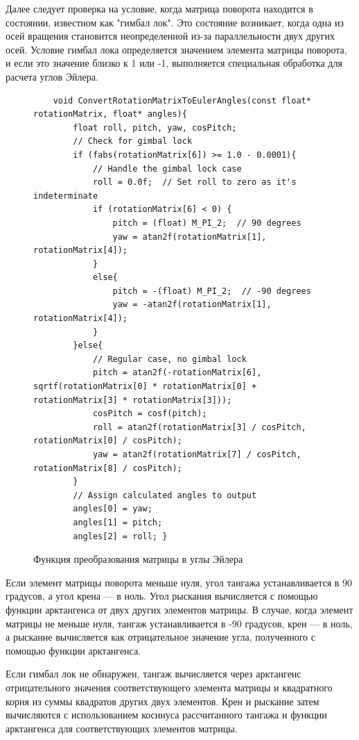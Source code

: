 Далее следует проверка на условие, когда матрица поворота находится в состоянии, известном как "гимбал лок". Это состояние возникает, когда одна из осей вращения становится неопределенной из-за параллельности двух других осей. Условие гимбал лока определяется значением элемента матрицы поворота, и если это значение близко к 1 или -1, выполняется специальная обработка для расчета углов Эйлера.



\begin{figure}[H]
	\centering
	\begin{verbatim}
    void ConvertRotationMatrixToEulerAngles(const float* rotationMatrix, float* angles){
        float roll, pitch, yaw, cosPitch;
        // Check for gimbal lock
        if (fabs(rotationMatrix[6]) >= 1.0 - 0.0001){
            // Handle the gimbal lock case
            roll = 0.0f;  // Set roll to zero as it's indeterminate
            if (rotationMatrix[6] < 0) {
                pitch = (float) M_PI_2;  // 90 degrees
                yaw = atan2f(rotationMatrix[1], rotationMatrix[4]);
            }
            else{
                pitch = -(float) M_PI_2;  // -90 degrees
                yaw = -atan2f(rotationMatrix[1], rotationMatrix[4]);
            }
        }else{
            // Regular case, no gimbal lock
            pitch = atan2f(-rotationMatrix[6], sqrtf(rotationMatrix[0] * rotationMatrix[0] + rotationMatrix[3] * rotationMatrix[3]));
            cosPitch = cosf(pitch);
            roll = atan2f(rotationMatrix[3] / cosPitch, rotationMatrix[0] / cosPitch);
            yaw = atan2f(rotationMatrix[7] / cosPitch, rotationMatrix[8] / cosPitch);
        }
        // Assign calculated angles to output
        angles[0] = yaw;
        angles[1] = pitch;
        angles[2] = roll; }
	\end{verbatim}
	\caption{Функция преобразования матрицы в углы Эйлера}\label{codeConvertRotationMatrixToEulerAngles}
\end{figure}
Если элемент матрицы поворота меньше нуля, угол тангажа устанавливается в 90 градусов, а угол крена — в ноль. Угол рыскания вычисляется с помощью функции арктангенса от двух других элементов матрицы. В случае, когда элемент матрицы не меньше нуля, тангаж устанавливается в -90 градусов, крен — в ноль, а рыскание вычисляется как отрицательное значение угла, полученного с помощью функции арктангенса.


Если гимбал лок не обнаружен, тангаж вычисляется через арктангенс отрицательного значения соответствующего элемента матрицы и квадратного корня из суммы квадратов других двух элементов. Крен и рыскание затем вычисляются с использованием косинуса рассчитанного тангажа и функции арктангенса для соответствующих элементов матрицы.

